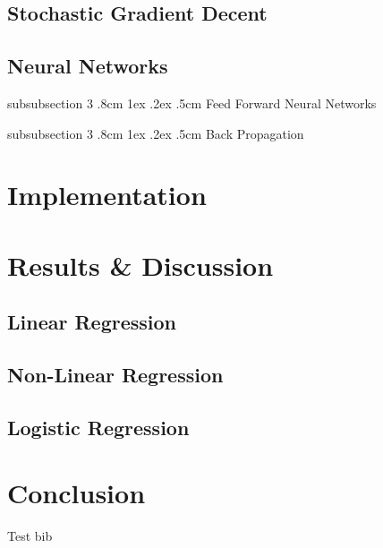 \documentclass[%
reprint,
amsmath,amssymb,
aps,
]{revtex4-2}
\makeatletter
\renewcommand{\subsubsection}{%
	\@startsection
	{subsubsection}%
	{3}%
	{\z@}%
	{.8cm \@plus1ex \@minus .2ex}%
	{.5cm}%
	{\normalfont\small\centering}%
}
\makeatother
\begin{document}
\subsection{Stochastic Gradient Decent}

\subsection{Neural Networks}

\subsubsection{Feed Forward Neural Networks}

\subsubsection{Back Propagation}

\section{Implementation}

\section{Results \& Discussion}

\subsection{Linear Regression}

\subsection{Non-Linear Regression}

\subsection{Logistic Regression}


\section{Conclusion}
Test bib \cite{Planck:2018vyg}



	
\end{document}

